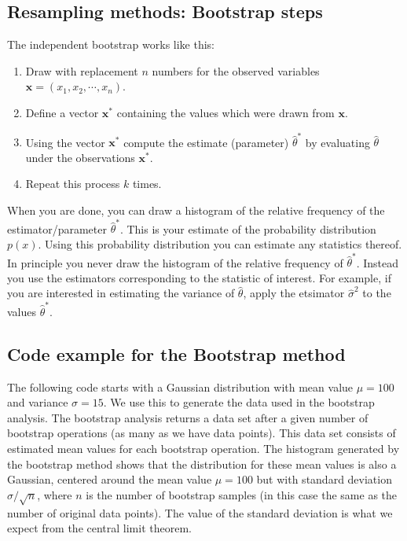 \documentclass[%
oneside,                 %
final,                   %
10pt]{article}
\begin{document}
\subsection*{Resampling methods: Bootstrap steps}

The independent bootstrap works like this: 

\begin{enumerate}
\item Draw with replacement $n$ numbers for the observed variables $\bm{x} = (x_1,x_2,\cdots,x_n)$. 

\item Define a vector $\bm{x}^*$ containing the values which were drawn from $\bm{x}$. 

\item Using the vector $\bm{x}^*$ compute the estimate (parameter) $\widehat{\theta}^*$ by evaluating $\widehat \theta$ under the observations $\bm{x}^*$. 

\item Repeat this process $k$ times. 
\end{enumerate}

\noindent
When you are done, you can draw a histogram of the relative frequency
of the estimator/parameter $\widehat \theta^*$. This is your estimate of the probability
distribution $p(x)$. Using this probability distribution you can
estimate any statistics thereof. In principle you never draw the
histogram of the relative frequency of $\widehat{\theta}^*$. Instead
you use the estimators corresponding to the statistic of interest. For
example, if you are interested in estimating the variance of $\widehat
\theta$, apply the etsimator $\widehat \sigma^2$ to the values
$\widehat \theta ^*$.


\subsection*{Code example for the Bootstrap method}

The following code starts with a Gaussian distribution with mean value
$\mu =100$ and variance $\sigma=15$. We use this to generate the data
used in the bootstrap analysis. The bootstrap analysis returns a data
set after a given number of bootstrap operations (as many as we have
data points). This data set consists of estimated mean values for each
bootstrap operation. The histogram generated by the bootstrap method
shows that the distribution for these mean values is also a Gaussian,
centered around the mean value $\mu=100$ but with standard deviation
$\sigma/\sqrt{n}$, where $n$ is the number of bootstrap samples (in
this case the same as the number of original data points). The value
of the standard deviation is what we expect from the central limit
theorem.
\end{document}
